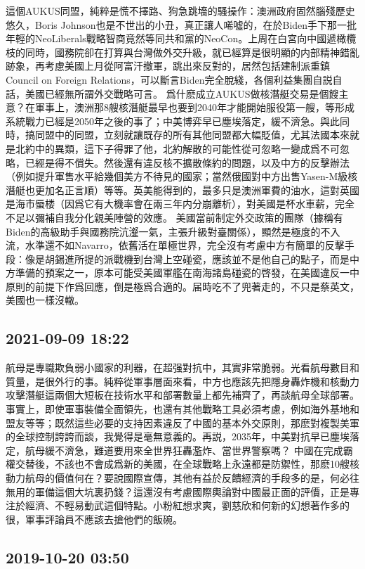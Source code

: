 \documentclass[twocolumn]{ctexart}
\begin{document}
這個AUKUS同盟，純粹是慌不擇路、狗急跳墻的騷操作：澳洲政府固然腦殘歷史悠久，Boris Johnson也是不世出的小丑，真正讓人唏噓的，在於Biden手下那一批年輕的NeoLiberals戰略智商竟然等同共和黨的NeoCon。上周在白宮向中國遞橄欖枝的同時，國務院卻在打算與台灣做外交升級，就已經算是很明顯的内部精神錯亂跡象，再考慮美國上月從阿富汗撤軍，跳出來反對的，居然包括建制派重鎮Council on Foreign Relations，可以斷言Biden完全脫綫，各個利益集團自説自話，美國已經無所謂外交戰略可言。
爲什麽成立AUKUS做核潛艇交易是個餿主意？在軍事上，澳洲那8艘核潛艇最早也要到2040年才能開始服役第一艘，等形成系統戰力已經是2050年之後的事了；中美博弈早已塵埃落定，緩不濟急。與此同時，搞同盟中的同盟，立刻就讓既存的所有其他同盟都大幅貶值，尤其法國本來就是北約中的異類，這下子得罪了他，北約解散的可能性從可忽略一變成爲不可忽略，已經是得不償失。然後還有違反核不擴散條約的問題，以及中方的反擊辦法（例如提升軍售水平給幾個美方不待見的國家；當然俄國對中方出售Yasen-M級核潛艇也更加名正言順）等等。英美能得到的，最多只是澳洲軍費的油水，這對英國是海市蜃楼（因爲它有大機率會在兩三年内分崩離析），對美國是杯水車薪，完全不足以彌補自我分化親美陣營的效應。
美國當前制定外交政策的團隊（據稱有Biden的高級助手與國務院沆瀣一氣，主張升級對臺關係），顯然是極度的不入流，水準還不如Navarro，依舊活在單極世界，完全沒有考慮中方有簡單的反擊手段：像是胡錫進所提的派戰機到台灣上空碰瓷，應該並不是他自己的點子，而是中方準備的預案之一，原本可能受美國軍艦在南海諸島碰瓷的啓發，在美國違反一中原則的前提下作爲回應，倒是極爲合適的。届時吃不了兜著走的，不只是蔡英文，美國也一樣沒轍。
\subsection*{2021-09-09 18:22}

航母是專職欺負弱小國家的利器，在超强對抗中，其實非常脆弱。光看航母數目和質量，是很外行的事。純粹從軍事層面來看，中方也應該先把隱身轟炸機和核動力攻擊潛艇這兩個大短板在技術水平和部署數量上都先補齊了，再談航母全球部署。
事實上，即使軍事裝備全面領先，也還有其他戰略工具必須考慮，例如海外基地和盟友等等；既然這些必要的支持因素違反了中國的基本外交原則，那麽對複製美軍的全球控制誇誇而談，我覺得是毫無意義的。再説，2035年，中美對抗早已塵埃落定，航母緩不濟急，難道要用來全世界狂轟濫炸、當世界警察嗎？
中國在完成霸權交替後，不該也不會成爲新的美國，在全球戰略上永遠都是防禦性，那麽10艘核動力航母的價值何在？要說國際宣傳，其他有益於反饋經濟的手段多的是，何必往無用的軍備這個大坑裏扔錢？這還沒有考慮國際輿論對中國最正面的評價，正是專注於經濟、不輕易動武這個特點。小粉紅想求爽，劉慈欣和何新的幻想著作多的很，軍事評論員不應該去搶他們的飯碗。
\subsection*{2019-10-20 03:50}
\end{document}
